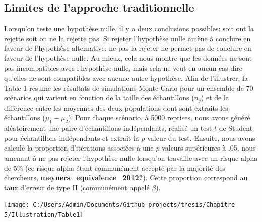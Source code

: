 \documentclass[
  english,
  man]{apa6}
\begin{document}
\hypertarget{limites-de-lapproche-traditionnelle}{%
\subsection{Limites de l'approche traditionnelle}\label{limites-de-lapproche-traditionnelle}}

Lorsqu'on teste une hypothèse nulle, il y a deux conclusions possibles: soit ont la rejette soit on ne la rejette pas. Si rejeter l'hypothèse nulle amène à conclure en faveur de l'hypothèse alternative, ne pas la rejeter ne permet pas de conclure en faveur de l'hypothèse nulle. Au mieux, cela nous montre que les données ne sont pas incompatibles avec l'hypothèse nulle, mais cela ne veut en aucun cas dire qu'elles ne sont compatibles avec aucune autre hypothèse. Afin de l'illustrer, la Table 1 résume les résultats de simulations Monte Carlo pour un ensemble de 70 scénarios qui varient en fonction de la taille des échantillons (\(n_j\)) et de la différence entre les moyennes des deux populations dont sont extraits les échantillons (\(\mu_1-\mu_2\)). Pour chaque scénario, à 5000 reprises, nous avons généré aléatoirement une paire d'échantillons indépendants, réalisé un test \(t\) de Student pour échantillons indépendants et extrait la \(p\)-valeur du test. Ensuite, nous avons calculé la proportion d'itérations associées à une \(p\)-valeurs supérieures à .05, nous amenant à ne pas rejeter l'hypothèse nulle lorsqu'on travaille avec un risque alpha de 5\% (ce risque alpha étant communément accepté par la majorité des chercheurs, \textbf{meyners\_equivalence\_2012?}). Cette proportion correspond au taux d'erreur de type II (communément appelé \(\beta\)).

\begin{flushleft}\texttt{[image: C:/Users/Admin/Documents/Github projects/thesis/Chapitre 5/Illustration/Table1]} \end{flushleft}
\newpage
\end{document}
